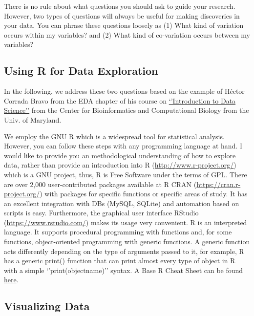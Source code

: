 \documentclass[
]{book}
\begin{document}
There is no rule about what questions you should ask to guide your research. However, two types of questions will always be useful for making discoveries in your data. You can phrase these questions loosely as (1) What kind of variation occurs within my variables? and (2) What kind of co-variation occurs between my variables?

\hypertarget{using-r-for-data-exploration}{%
\subsection{Using R for Data Exploration}\label{using-r-for-data-exploration}}

In the following, we address these two questions based on the example of Héctor Corrada Bravo from the EDA chapter of his course on \href{http://www.hcbravo.org/IntroDataSci/bookdown-notes/exploratory-data-analysis-visualization.html}{`'Introduction to Data Science''} from the Center for Bioinformatics and Computational Biology from the Univ. of Maryland.

We employ the GNU R which is a widespread tool for statistical analysis. However, you can follow these steps with any programming language at hand. I would like to provide you an methodological understanding of how to explore data, rather than provide an introduction into R (\url{http://www.r-project.org/}) which is a GNU project, thus, R is Free Software under the terms of GPL. There are over 2,000 user-contributed packages available at R CRAN (\url{https://cran.r-project.org/}) with packages for specific functions or specific areas of study. It has an excellent integration with DBs (MySQL, SQLite) and automation based on scripts is easy. Furthermore, the graphical user interface RStudio (\url{https://www.rstudio.com/}) makes its usage very convenient. R is an interpreted language. It supports procedural programming with functions and, for some functions, object-oriented programming with generic functions. A generic function acts differently depending on the type of arguments passed to it, for example, R has a generic print() function that can print almost every type of object in R with a simple `'print(objectname)'' syntax. A Base R Cheat Sheet can be found \href{https://www.povertyactionlab.org/sites/default/files/r-cheat-sheet.pdf}{here}.

\hypertarget{visualizing-data}{%
\subsection{Visualizing Data}\label{visualizing-data}}
\end{document}
